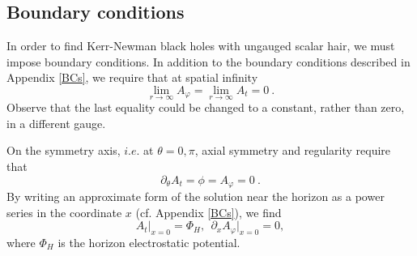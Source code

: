 \subsection{Boundary conditions}
\label{KNBCs}
In order to find Kerr-Newman black holes with ungauged scalar hair, we must impose boundary conditions.
In addition to the boundary conditions described in Appendix \ref{BCs}, we require that at spatial infinity
\begin{equation}
  \lim_{r\rightarrow\infty}A_\varphi=\lim_{r\rightarrow\infty}A_t=0\ .
\end{equation}
Observe that the last equality could be changed to a constant, rather than zero, in a different gauge.

On the symmetry axis, $i.e.$ at $\theta=0,\pi$, axial symmetry and regularity require that
\begin{equation}
  \partial_\theta A_t = \phi = A_\varphi = 0\ .
\end{equation} 
By writing an approximate form of the solution near the horizon as a power series in the coordinate $x$ (cf. Appendix \ref{BCs}), we find
\begin{equation}
  A_t \big|_{x=0} =  \Phi_H,~~ \partial_x A_\varphi \big|_{x=0}=0 ,
\end{equation}
where $\Phi_H$ is the horizon electrostatic potential. 
%
%
